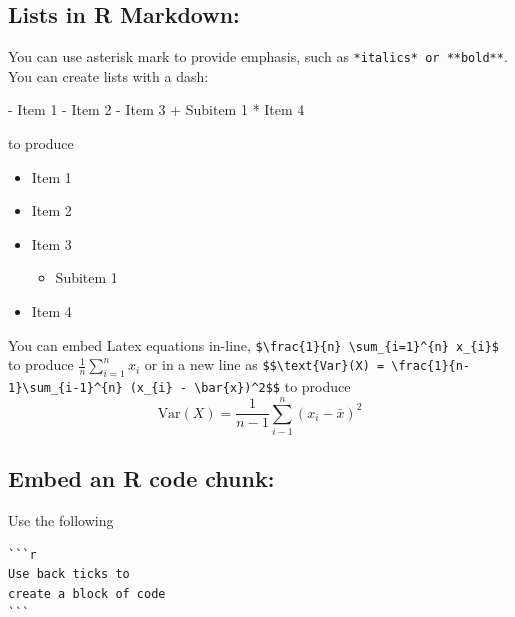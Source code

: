 \documentclass[
]{book}
\newenvironment{Shaded}{\begin{snugshade}}{\end{snugshade}}
\newcommand{\DecValTok}[1]{\textcolor[rgb]{0.00,0.00,0.81}{#1}}
\newcommand{\NormalTok}[1]{#1}
\newcommand{\SpecialCharTok}[1]{\textcolor[rgb]{0.00,0.00,0.00}{#1}}
\providecommand{\tightlist}{%
  \setlength{\itemsep}{0pt}\setlength{\parskip}{0pt}}
\begin{document}
\hypertarget{lists-in-r-markdown}{%
\subsection{Lists in R Markdown:}\label{lists-in-r-markdown}}

You can use asterisk mark to provide emphasis, such as \texttt{*italics*\ or\ **bold**}. You can create lists with a dash:

\begin{Shaded}
\begin{Highlighting}[]
\SpecialCharTok{{-}}\NormalTok{ Item }\DecValTok{1}
\SpecialCharTok{{-}}\NormalTok{ Item }\DecValTok{2}
\SpecialCharTok{{-}}\NormalTok{ Item }\DecValTok{3}
  \SpecialCharTok{+}\NormalTok{ Subitem }\DecValTok{1}
\SpecialCharTok{*}\NormalTok{ Item }\DecValTok{4}
\end{Highlighting}
\end{Shaded}

to produce

\begin{itemize}
\tightlist
\item
  Item 1
\item
  Item 2
\item
  Item 3

  \begin{itemize}
  \tightlist
  \item
    Subitem 1
  \end{itemize}
\item
  Item 4
\end{itemize}

You can embed Latex equations in-line, \texttt{\$\textbackslash{}frac\{1\}\{n\}\ \textbackslash{}sum\_\{i=1\}\^{}\{n\}\ x\_\{i\}\$} to produce \(\frac{1}{n} \sum_{i=1}^{n} x_{i}\) or in a new line as \texttt{\$\$\textbackslash{}text\{Var\}(X)\ =\ \textbackslash{}frac\{1\}\{n-1\}\textbackslash{}sum\_\{i-1\}\^{}\{n\}\ (x\_\{i\}\ -\ \textbackslash{}bar\{x\})\^{}2\$\$} to produce \[\text{Var}(X) = \frac{1}{n-1}\sum_{i-1}^{n} (x_{i} - \bar{x})^2\]

\hypertarget{embed-an-r-code-chunk}{%
\subsection{Embed an R code chunk:}\label{embed-an-r-code-chunk}}

Use the following

\begin{verbatim}
```r
Use back ticks to 
create a block of code
```
\end{verbatim}
\end{document}
